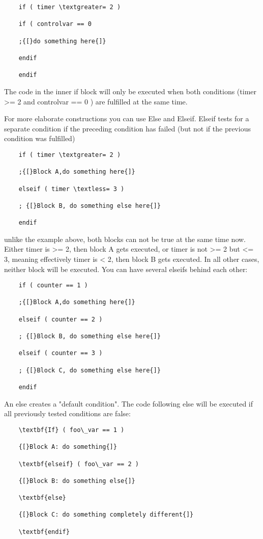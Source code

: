 \begin{lstlisting}
	if ( timer \textgreater= 2 )
	
	if ( controlvar == 0
	
	;{[}do something here{]}
	
	endif
	
	endif
\end{lstlisting}

The code in the inner if block will only be executed when both
conditions (timer \textgreater= 2 and controlvar == 0 ) are fulfilled at
the same time.

For more elaborate constructions you can use Else and Elseif. Elseif
tests for a separate condition if the preceding condition has failed
(but not if the previous condition was fulfilled)

\begin{lstlisting}
	if ( timer \textgreater= 2 )
	
	;{[}Block A,do something here{]}
	
	elseif ( timer \textless= 3 )
	
	; {[}Block B, do something else here{]}
	
	endif
\end{lstlisting}

unlike the example above, both blocks can not be true at the same time
now. Either timer is \textgreater= 2, then block A gets executed, or
timer is not \textgreater= 2 but \textless= 3, meaning effectively timer
is \textless{} 2, then block B gets executed. In all other cases,
neither block will be executed. You can have several elseifs behind each
other:

\begin{lstlisting}
	if ( counter == 1 )
	
	;{[}Block A,do something here{]}
	
	elseif ( counter == 2 )
	
	; {[}Block B, do something else here{]}
	
	elseif ( counter == 3 )
	
	; {[}Block C, do something else here{]}
	
	endif
\end{lstlisting}

An else creates a "default condition". The code following else will be
executed if all previously tested conditions are false:

\begin{lstlisting}
	\textbf{If} ( foo\_var == 1 )
	
	{[}Block A: do something{]}
	
	\textbf{elseif} ( foo\_var == 2 )
	
	{[}Block B: do something else{]}
	
	\textbf{else}
	
	{[}Block C: do something completely different{]}
	
	\textbf{endif}
\end{lstlisting}

